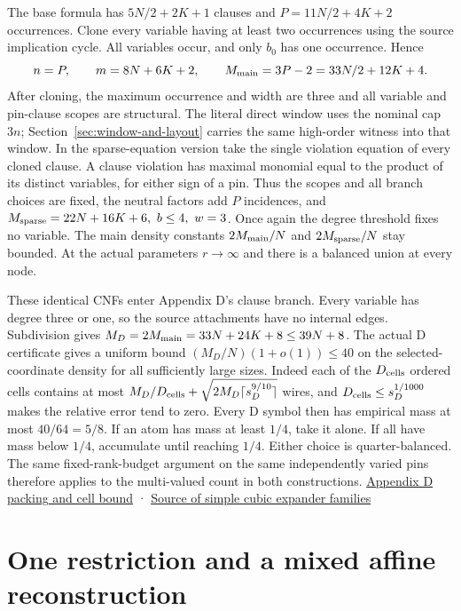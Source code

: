 \documentclass[
  11pt,
]{article}
\begin{document}
The base formula has \(5N/2+2K+1\) clauses and \(P=11N/2+4K+2\)
occurrences. Clone every variable having at least two occurrences using
the source implication cycle. All variables occur, and only \(b_0\) has
one occurrence. Hence \[
 n=P,\qquad m=8N+6K+2,\qquad M_{\rm main}=3P-2=33N/2+12K+4 .
\] After cloning, the maximum occurrence and width are three and all
variable and pin-clause scopes are structural. The literal direct window uses the nominal cap \(3n\); Section~\ref{sec:window-and-layout} carries the same high-order witness into that window. In the sparse-equation
version take the single violation equation of every cloned clause. A
clause violation has maximal monomial equal to the product of its
distinct variables, for either sign of a pin. Thus the scopes and all
branch choices are fixed, the neutral factors add \(P\) incidences, and
\(M_{\rm sparse}=22N+16K+6,\ b\le4,\ w=3\). Once again the degree
threshold fixes no variable. The main density constants
\(2M_{\rm main}/N\) and \(2M_{\rm sparse}/N\) stay bounded. At the
actual parameters \(r\to\infty\) and there is a balanced union at every
node.

These identical CNFs enter Appendix D's clause branch. Every variable
has degree three or one, so the source attachments have no internal
edges. Subdivision gives \(M_D=2M_{\rm main}=33N+24K+8\le39N+8\). The
actual D certificate gives a uniform bound \((M_D/N)(1+o(1))\le40\) on
the selected-coordinate density for all sufficiently large sizes. Indeed
each of the \(D_{\rm cells}\) ordered cells contains at most
\(M_D/D_{\rm cells}+\sqrt{2M_D\lceil s_D^{9/10}\rceil}\) wires, and
\(D_{\rm cells}\le s_D^{1/1000}\) makes the relative error tend to zero.
Every D symbol then has empirical mass at most \(40/64=5/8\). If an atom
has mass at least \(1/4\), take it alone. If all have mass below
\(1/4\), accumulate until reaching \(1/4\). Either choice is
quarter-balanced. The same fixed-rank-budget argument on the same
independently varied pins therefore applies to the multi-valued count in
both constructions.
\href{https://github.com/openai/math/blob/main/preprints/The-Exponential-Time-Hypothesis-is-False-October-25-2026/build/quantitative-contraction.tex\#L73-L172}{Appendix
D packing and cell bound} ·
\href{https://annals.math.princeton.edu/2015/182-1/p07}{Source of simple
cubic expander families}

\section{One restriction and a mixed affine
reconstruction}\label{one-restriction-and-a-mixed-affine-reconstruction}
\end{document}
